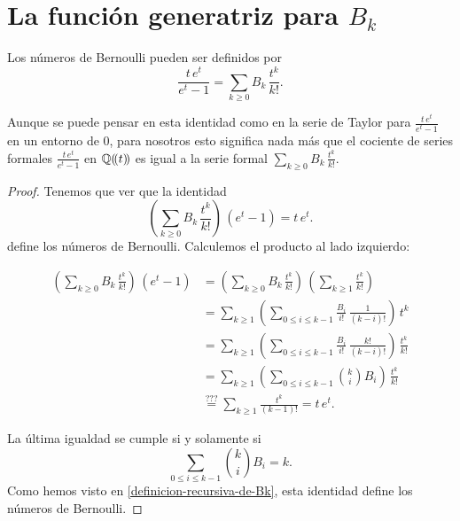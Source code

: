\documentclass{article}
\numberwithin{equation}{section}
\theoremstyle{definition}
\begin{document}

\section{La función generatriz para $B_k$}
\label{section:funcion-generatriz-para-Bk}

\begin{teorema}
  Los números de Bernoulli pueden ser definidos por
  $$\frac{t\,e^t}{e^t - 1} = \sum_{k \ge 0} B_k \, \frac{t^k}{k!}.$$
\end{teorema}

Aunque se puede pensar en esta identidad como en la serie de Taylor para
$\frac{t\,e^t}{e^t - 1}$ en un entorno de $0$, para nosotros esto significa nada
más que el cociente de series formales $\frac{t\,e^t}{e^t - 1}$ en
$\mathbb{Q} (\!(t)\!)$ es igual a la serie formal
$\sum_{k \ge 0} B_k \, \frac{t^k}{k!}$.

\begin{proof}
  Tenemos que ver que la identidad
  $$\left(\sum_{k \ge 0} B_k \, \frac{t^k}{k!}\right)\,(e^t-1) = t\,e^t.$$
  define los números de Bernoulli. Calculemos el producto al lado izquierdo:

  \begin{align*}
    \left(\sum_{k \ge 0} B_k \, \frac{t^k}{k!}\right)\,(e^t-1) & = 
                                                                 \left(\sum_{k \ge 0} B_k \, \frac{t^k}{k!}\right)\,\left(\sum_{k\ge 1} \frac{t^k}{k!}\right) \\
                                                               & = \sum_{k \ge 1} \left(\sum_{0 \le i \le k-1} \frac{B_i}{i!}\,\frac{1}{(k-i)!}\right)\,t^k \\
                                                               & = \sum_{k \ge 1} \left(\sum_{0 \le i \le k-1} \frac{B_i}{i!}\,\frac{k!}{(k-i)!}\right)\,\frac{t^k}{k!} \\
                                                               & = \sum_{k \ge 1} \left(\sum_{0 \le i \le k-1} {k \choose i} B_i\right)\,\frac{t^k}{k!} \\
                                                               & \stackrel{???}{=} \sum_{k\ge 1} \frac{t^k}{(k-1)!} = t\,e^t.
  \end{align*}

  La última igualdad se cumple si y solamente si
  $$\sum_{0 \le i \le k-1} {k \choose i} B_i = k.$$
  Como hemos visto en \ref{definicion-recursiva-de-Bk}, esta identidad define
  los números de Bernoulli.
\end{proof}
\end{document}
